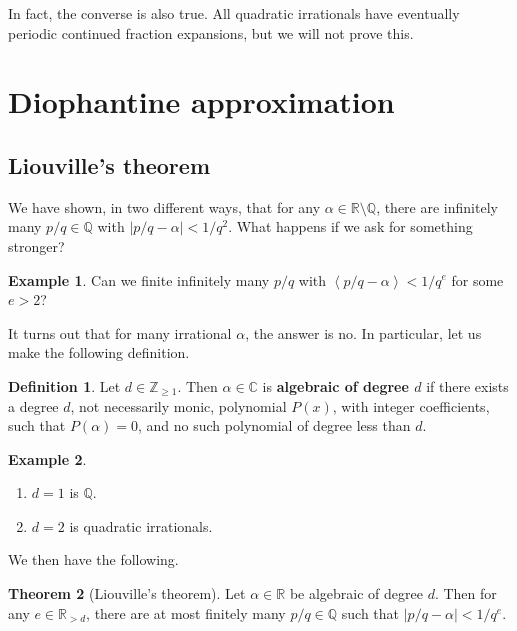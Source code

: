 \documentclass{article}
\newcommand{\Z}{\mathbb{Z}}
\newcommand{\Q}{\mathbb{Q}}
\newcommand{\R}{\mathbb{R}}
\newcommand{\C}{\mathbb{C}}
\newcommand{\rb}[1]{\left( #1 \right)}
\newcommand{\ab}[1]{\left\langle #1 \right\rangle}
\newcommand{\abs}[1]{\left\lvert #1 \right\rvert}
\theoremstyle{definition}\newtheorem{definition}{Definition}
\theoremstyle{definition}\newtheorem{remark}[definition]{Remark}
\theoremstyle{definition}\newtheorem*{example}{Example}
\theoremstyle{definition}\newtheorem*{note}{Note}
\newtheorem{theorem}[definition]{Theorem}
\begin{document}
In fact, the converse is also true. All quadratic irrationals have eventually periodic continued fraction expansions, but we will not prove this.

\section{Diophantine approximation}

\subsection{Liouville's theorem}

We have shown, in two different ways, that for any $ \alpha \in \R \setminus \Q $, there are infinitely many $ p / q \in \Q $ with $ \abs{p / q - \alpha} < 1 / q^2 $. What happens if we ask for something stronger?

\begin{example}
Can we finite infinitely many $ p / q $ with $ \ab{p / q - \alpha} < 1 / q^e $ for some $ e > 2 $?
\end{example}

It turns out that for many irrational $ \alpha $, the answer is no. In particular, let us make the following definition.

\begin{definition}
Let $ d \in \Z_{\ge 1} $. Then $ \alpha \in \C $ is \textbf{algebraic of degree $ d $} if there exists a degree $ d $, not necessarily monic, polynomial $ P\rb{x} $, with integer coefficients, such that $ P\rb{\alpha} = 0 $, and no such polynomial of degree less than $ d $.
\end{definition}

\begin{example}
\hfill
\begin{enumerate}
\item $ d = 1 $ is $ \Q $.
\item $ d = 2 $ is quadratic irrationals.
\end{enumerate}
\end{example}

We then have the following.

\begin{theorem}[Liouville's theorem]
Let $ \alpha \in \R $ be algebraic of degree $ d $. Then for any $ e \in \R_{> d} $, there are at most finitely many $ p / q \in \Q $ such that $ \abs{p / q - \alpha} < 1 / q^e $.
\end{theorem}
\end{document}
